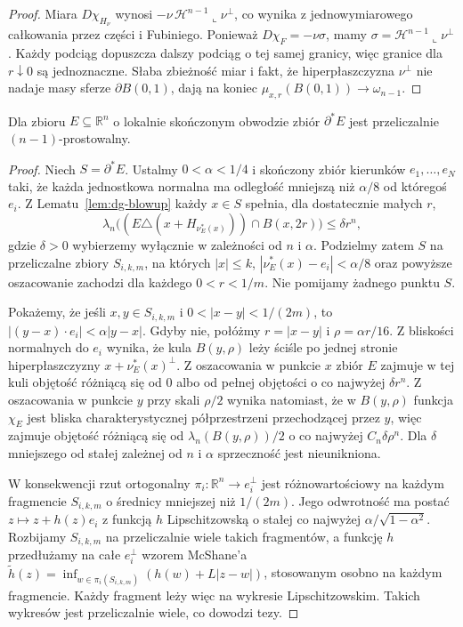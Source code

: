 \begin{proof}
Miara $D\chi_{H_\nu}$ wynosi
$-\nu\,\mathcal H^{n-1}\llcorner\nu^\perp$,
co wynika z jednowymiarowego całkowania
przez części i Fubiniego. Ponieważ
$D\chi_F=-\nu\sigma$, mamy
$\sigma=\mathcal H^{n-1}\llcorner\nu^\perp$.
Każdy podciąg dopuszcza dalszy podciąg o tej
samej granicy, więc granice dla $r\downarrow0$
są jednoznaczne. Słaba zbieżność miar i fakt,
że hiperpłaszczyzna $\nu^\perp$ nie nadaje masy
sferze $\partial B(0,1)$, dają na koniec
$\mu_{x,r}(B(0,1))\to\omega_{n-1}$.
\end{proof}

\begin{lemat}
\label{lem:dg-rectifiability}
Dla zbioru $E\subseteq\mathbb R^n$ o lokalnie
skończonym obwodzie zbiór $\partial^*E$ jest
przeliczalnie $(n-1)$-prostowalny.
\end{lemat}
\begin{proof}
Niech $S=\partial^*E$. Ustalmy $0<\alpha<1/4$
i skończony zbiór kierunków $e_1,\ldots,e_N$
taki, że każda jednostkowa normalna ma odległość
mniejszą niż $\alpha/8$ od któregoś $e_i$.
Z Lematu~\ref{lem:dg-blowup} każdy $x\in S$
spełnia, dla dostatecznie małych $r$,
\[
 \lambda_n\bigl((E\triangle(x+H_{\nu_E^*(x)}))
 \cap B(x,2r)\bigr)\le\delta r^n,
\]
gdzie $\delta>0$ wybierzemy wyłącznie w
zależności od $n$ i $\alpha$.
Podzielmy zatem $S$ na przeliczalne zbiory
$S_{i,k,m}$, na których $|x|\le k$,
$|\nu_E^*(x)-e_i|<\alpha/8$ oraz powyższe
oszacowanie zachodzi dla każdego $0<r<1/m$.
Nie pomijamy żadnego punktu $S$.

Pokażemy, że jeśli $x,y\in S_{i,k,m}$ i
$0<|x-y|<1/(2m)$, to
$|(y-x)\cdot e_i|<\alpha|y-x|$.
Gdyby nie, połóżmy $r=|x-y|$ i
$\rho=\alpha r/16$. Z bliskości normalnych
do $e_i$ wynika, że kula $B(y,\rho)$ leży
ściśle po jednej stronie hiperpłaszczyzny
$x+\nu_E^*(x)^\perp$. Z oszacowania w punkcie
$x$ zbiór $E$ zajmuje w tej kuli objętość
różniącą się od $0$ albo od pełnej objętości
o co najwyżej $\delta r^n$.
Z oszacowania w punkcie $y$ przy skali $\rho/2$
wynika natomiast, że w $B(y,\rho)$ funkcja
$\chi_E$ jest bliska charakterystycznej
półprzestrzeni przechodzącej przez $y$,
więc zajmuje objętość różniącą się od
$\lambda_n(B(y,\rho))/2$ o co najwyżej
$C_n\delta\rho^n$. Dla
$\delta$ mniejszego od stałej zależnej od
$n$ i $\alpha$ sprzeczność jest nieunikniona.

W konsekwencji rzut ortogonalny
$\pi_i:\mathbb R^n\to e_i^\perp$ jest
różnowartościowy na każdym fragmencie
$S_{i,k,m}$ o średnicy mniejszej niż $1/(2m)$.
Jego odwrotność ma postać
$z\mapsto z+h(z)e_i$ z funkcją $h$
Lipschitzowską o stałej co najwyżej
$\alpha/\sqrt{1-\alpha^2}$.
Rozbijamy $S_{i,k,m}$ na przeliczalnie wiele
takich fragmentów, a funkcję $h$ przedłużamy
na całe $e_i^\perp$ wzorem McShane'a
$\widetilde h(z)=\inf_{w\in\pi_i(S_{i,k,m})}
(h(w)+L|z-w|)$, stosowanym osobno na każdym
fragmencie. Każdy fragment leży więc na
wykresie Lipschitzowskim. Takich wykresów jest
przeliczalnie wiele, co dowodzi tezy.
\end{proof}

